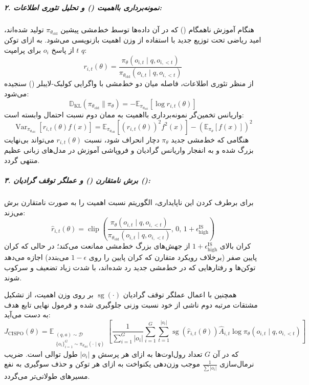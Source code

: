 \subparagraph*{۲. نمونه‌برداری بااهمیت () و تحلیل تئوری اطلاعات:}
هنگام آموزش ناهمگام () که در آن داده‌ها توسط خط‌مشی پیشین $\pi_{\theta_{\text{old}}}$ تولید شده‌اند، امید ریاضی تحت توزیع جدید با استفاده از وزن اهمیت بازنویسی می‌شود. به ازای توکن $t$ از پاسخ $o_i$ برای پرامپت $q$:
\begin{equation}
    r_{i,t}(\theta) = \frac{\pi_\theta(o_{i,t} \mid q, o_{i,<t})}{\pi_{\theta_{\text{old}}}(o_{i,t} \mid q, o_{i,<t})}
\end{equation}
از منظر تئوری اطلاعات، فاصله میان دو خط‌مشی با واگرایی کولبک-لایبلر () سنجیده می‌شود:
\begin{equation}
    \mathbb{D}_{\text{KL}}(\pi_{\theta_{\text{old}}} \parallel \pi_\theta) = -\mathbb{E}_{\pi_{\theta_{\text{old}}}} \left[ \log r_{i,t}(\theta) \right]
\end{equation}
واریانس تخمین‌گر نمونه‌برداری بااهمیت به ممان دوم نسبت احتمال وابسته است:
\begin{equation}
    \operatorname{Var}_{\pi_{\theta_{\text{old}}}}\left[ r_{i,t}(\theta) f(x) \right] = \mathbb{E}_{\pi_{\theta_{\text{old}}}}\left[ (r_{i,t}(\theta))^2 f^2(x) \right] - \left( \mathbb{E}_{\pi_\theta}[f(x)] \right)^2
\end{equation}
هنگامی که خط‌مشی جدید $\pi_\theta$ دچار انحراف شود، نسبت $r_{i,t}(\theta)$ می‌تواند بی‌نهایت بزرگ شده و به انفجار واریانس گرادیان و فروپاشی آموزش در مدل‌های زبانی عظیم منتهی گردد.

\subparagraph*{۳. برش نامتقارن () و عملگر توقف گرادیان ():}
برای برطرف کردن این ناپایداری، الگوریتم  نسبت اهمیت را به صورت نامتقارن برش می‌زند:
\begin{equation}
    \hat{r}_{i,t}(\theta) = \operatorname{clip}\left( \frac{\pi_\theta(o_{i,t} \mid q, o_{i,<t})}{\pi_{\theta_{\text{old}}}(o_{i,t} \mid q, o_{i,<t})}, \, 0, \, 1 + \epsilon_{\text{high}}^{\text{IS}} \right)
\end{equation}
کران بالای $1 + \epsilon_{\text{high}}^{\text{IS}}$ از جهش‌های بزرگ خط‌مشی ممانعت می‌کند؛ در حالی که کران پایین صفر (برخلاف رویکرد متقارن  \cite{schulman2017ppo} که کران پایین را روی $1-\epsilon$ می‌بندد) اجازه می‌دهد توکن‌ها و رفتارهایی که در خط‌مشی جدید رد شده‌اند، با شدت زیاد تضعیف و سرکوب شوند. 

همچنین با اعمال عملگر توقف گرادیان $\operatorname{sg}(\cdot)$ بر روی وزن اهمیت، از تشکیل مشتقات مرتبه دوم ناشی از خود نسبت وزنی جلوگیری شده و فرمول نهایی تابع هدف  به دست می‌آید:
\begin{equation}
    J_{\text{CISPO}}(\theta) = \mathbb{E}_{\substack{(q,a) \sim \mathcal{D} \\ \{o_i\}_{i=1}^G \sim \pi_{\theta_{\text{old}}}(\cdot \mid q)}} \left[ \frac{1}{\sum_{i=1}^G |o_i|} \sum_{i=1}^G \sum_{t=1}^{|o_i|} \operatorname{sg}\left(\hat{r}_{i,t}(\theta)\right) \hat{A}_{i,t} \log \pi_\theta(o_{i,t} \mid q, o_{i,<t}) \right]
\end{equation}
که در آن $G$ تعداد رول‌اوت‌ها به ازای هر پرسش و $|o_i|$ طول توالی است. ضریب نرمال‌سازی $\frac{1}{\sum |o_i|}$ موجب وزن‌دهی یکنواخت به ازای هر توکن و حذف سوگیری به نفع مسیرهای طولانی‌تر می‌گردد.


